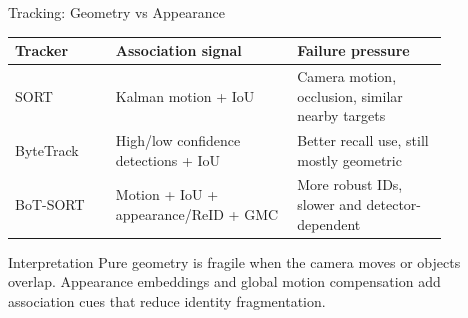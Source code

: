 \documentclass[aspectratio=169,10pt]{beamer}
\begin{document}
\begin{frame}{Tracking: Geometry vs Appearance}
  \centering
  \small
  \begin{tabular}{@{}p{0.20\linewidth}p{0.36\linewidth}p{0.30\linewidth}@{}}
    \toprule
    Tracker & Association signal & Failure pressure \\
    \midrule
    SORT & Kalman motion + IoU & Camera motion, occlusion, similar nearby targets \\
    ByteTrack & High/low confidence detections + IoU & Better recall use, still mostly geometric \\
    BoT-SORT & Motion + IoU + appearance/ReID + GMC & More robust IDs, slower and detector-dependent \\
    \bottomrule
  \end{tabular}

  \vspace{0.9em}
  \begin{block}{Interpretation}
    Pure geometry is fragile when the camera moves or objects overlap. Appearance embeddings and global motion compensation add association cues that reduce identity fragmentation.
  \end{block}
\end{frame}
\end{document}
